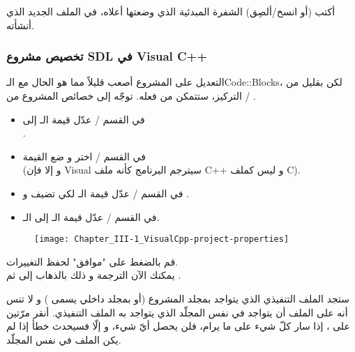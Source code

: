 أكتب (أو انسخ/ألصِق) الشفرة المبدئية الذي وضعتها أعلاه، في الملف الجديد الذي أنشأته.

\subsubsection{تخصيص مشروع \textenglish{SDL} في \textenglish{Visual C++}}

التعديل على المشروع أصعب قليلاً مما هو الحال مع الـ\textenglish{Code::Blocks}،
لكن بقليل من التركيز، ستتمكن من فعله. توجّه إلى خصائص المشروع من
 / .

\begin{itemize}
	\item في القسم
	 / 
	عدّل قيمة الـ
	إلى\\
	.
	\item في القسم 
	 / 
	اختر
	و ضع القيمة\\
	(و إلا فإن
	\textenglish{Visual}
	سيترجم البرنامج كأنه ملف
	\textenglish{C++}
	و ليس كملف
	\textenglish{C}).
	\item في القسم  
	 / 
	عدّل قيمة الـ
	لكي تضيف
	و
	.
	\item في القسم
	 / 
	عدّل قيمة الـ
	إلى الـ.
\end{itemize}

\begin{figure}[H]
	\centering
	\texttt{[image: Chapter\_III-1\_VisualCpp-project-properties]}
\end{figure}


قم بالضغط على "موافق" لحفظ التغييرات.\\
يمكنك الآن الترجمة و ذلك بالذهاب إلى
ثم
.

ستجد الملف التنفيذي الذي يتواجد بمجلد المشروع (أو بمجلد داخلي يسمى
)
و لا تنس أنه على الملف
أن يتواجد في نفس المجلّد الذي يتواجد به الملف التنفيذي. أنقر مرّتين على
،
 إذا سار كلّ شيء على ما يرام، فلن يحصل أيّ شيء، و إلّا فسيحدث خطأ إذا لم يكن الملف
في نفس المجلّد.

